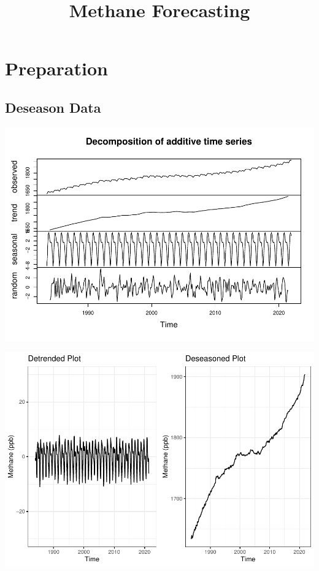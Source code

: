 \documentclass[
]{article}
\title{Methane Forecasting}
\author{}
\date{\vspace{-2.5em}}
\begin{document}
\maketitle

\section{Preparation}\label{preparation}

\subsection{Deseason Data}\label{deseason-data}

\includegraphics{Methane_Forecasting_files/figure-latex/unnamed-chunk-2-1.pdf}

\includegraphics{Methane_Forecasting_files/figure-latex/unnamed-chunk-3-1.pdf}
\end{document}
